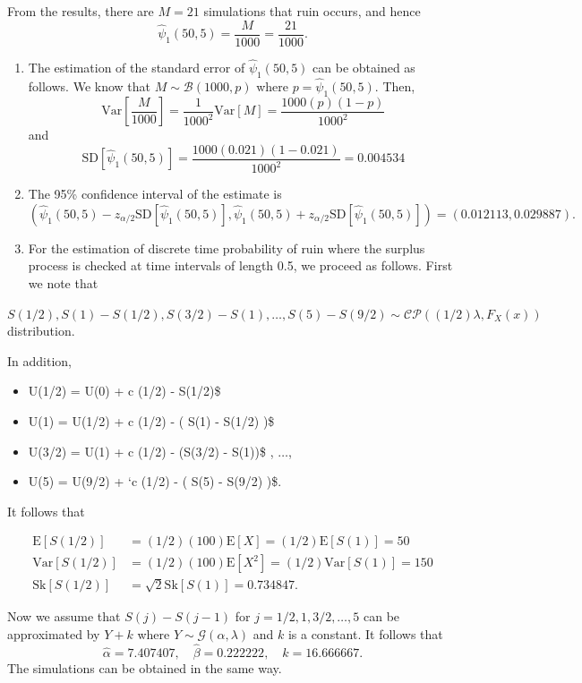 \documentclass[landscape, 20pt]{extreport}
\theoremstyle{definition}
\theoremstyle{definition}
\theoremstyle{definition}
\theoremstyle{definition}
\theoremstyle{remark}
\begin{document}
From the results, there are \(M = 21\) simulations that ruin occurs, and hence
\[\hat{\psi}_1(50, 5) = \frac{M}{1000} = \frac{21}{1000}.\]

\begin{enumerate}
\def\labelenumi{\arabic{enumi}.}
\setcounter{enumi}{1}
\item
  The estimation of the standard error of \(\hat{\psi}_1(50, 5)\) can be obtained as follows. We know that \(M \sim \mathcal{B}(1000,p)\) where \(p = \hat{\psi}_1(50, 5)\). Then,
  \[\textrm{Var}\left[\frac{M}{1000}\right] = \frac{1}{1000^2}\textrm{Var}[M] = \frac{1000 (p) (1-p)}{1000^2}\] and
  \[ \textrm{SD}[\hat{\psi}_1(50, 5)] = \frac{1000 (0.021) (1-0.021)}{1000^2} = 0.004534 \]
\item
  The 95\% confidence interval of the estimate is
  \[ (\hat{\psi}_1(50, 5) - z_{\alpha/2}\textrm{SD}[\hat{\psi}_1(50, 5)], \hat{\psi}_1(50, 5) + z_{\alpha/2} \textrm{SD}[\hat{\psi}_1(50, 5)]) = (0.012113,0.029887).\]
\item
  For the estimation of discrete time probability of ruin where the surplus process is checked at time intervals of length 0.5, we proceed as follows. First we note that
\end{enumerate}

\(S(1/2), S(1) - S(1/2), S(3/2) - S(1), \ldots, S(5) - S(9/2) \sim \mathcal{CP}((1/2)\lambda, F_X(x))\) distribution.

In addition,

\begin{itemize}
\item
  U(1/2) = U(0) + c (1/2) - S(1/2)\$
\item
  U(1) = U(1/2) + c (1/2) - ( S(1) - S(1/2) )\$
\item
  U(3/2) = U(1) + c (1/2) - (S(3/2) - S(1))\$ , \(\ldots\),
\item
  U(5) = U(9/2) + `c (1/2) - ( S(5) - S(9/2) )\$.
\end{itemize}

It follows that

\begin{align}
\mathrm{E}[S(1/2)] &= (1/2)(100)\mathrm{E}[X] = (1/2)\mathrm{E}[S(1)] = 50 \\
\mathrm{Var}[S(1/2)] &= (1/2)(100)\mathrm{E}[X^2] =  (1/2)\mathrm{Var}[S(1)]  = 150 \\
\mathrm{Sk}[S(1/2)] &= \sqrt{2} \mathrm{Sk}[S(1)] = 0.734847 .
\end{align}

Now we assume that \(S(j) - S(j-1)\) for \(j = 1/2, 1, 3/2, \ldots, 5\) can be approximated by \(Y + k\) where
\(Y \sim \mathcal{G}(\alpha, \lambda)\) and \(k\) is a constant. It follows that
\[ \hat{\alpha} = 7.407407, \quad \hat{\beta} = 0.222222, \quad \hat{k} = 16.666667.  \]
The simulations can be obtained in the same way.
\end{document}
